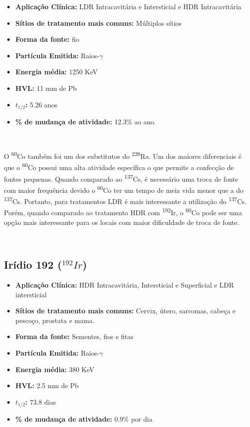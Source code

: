 \documentclass[11pt,a4paper]{article}
\begin{document}
			\begin{itemize}
				\item \textbf{Aplicação Clínica:} LDR Intracavitária e Intersticial e HDR Intracavitária
				\item \textbf{Sítios de tratamento mais comuns:} Múltiplos sítios
				\item \textbf{Forma da fonte:} fio
				\item \textbf{Partícula Emitida:} Raios-$\gamma$
				\item \textbf{Energia média: } 1250 KeV
				\item \textbf{HVL:} 11 mm de Pb
				\item \textbf{$t_{1/2}$:} 5.26 anos
				\item \textbf{\% de mudança de atividade: } 12.3\% ao ano.
			\end{itemize}

			\

			O \textsuperscript{60}Co também foi um dos substitutos do \textsuperscript{226}Ra. Um dos maiores diferenciais é que o \textsuperscript{60}Co possui uma alta atividade específica o que permite a confecção de fontes pequenas. Quando comparado ao \textsuperscript{137}Cs, é necessário uma troca de fonte com maior frequência devido o \textsuperscript{60}Co ter um tempo de meia vida menor que a do \textsuperscript{137}Cs. Portanto, para tratamentos LDR é mais interessante a utilização do \textsuperscript{137}Cs. Porém, quando comparado ao tratamento HDR com \textsuperscript{192}Ir, o \textsuperscript{60}Co pode ser uma opção mais interessante para os locais com maior dificuldade de troca de fonte.

			\

		\subsection{Irídio 192 \textbf{\textcolor{CarnationPink}{(${}^{192}Ir$)}}}

			\begin{itemize}
				\item \textbf{Aplicação Clínica:} HDR Intracavitária, Intersticial e Superficial e LDR intersticial
				\item \textbf{Sítios de tratamento mais comuns:} Cervix, útero, sarcomas, cabeça e pescoço, prostata e mama.
				\item \textbf{Forma da fonte:} Sementes, fios e fitas
				\item \textbf{Partícula Emitida:} Raios-$\gamma$
				\item \textbf{Energia média: } 380 KeV
				\item \textbf{HVL:} 2.5 mm de Pb
				\item \textbf{$t_{1/2}$:} 73.8 dias
				\item \textbf{\% de mudança de atividade: } 0.9\% por dia
			\end{itemize}
\end{document}
